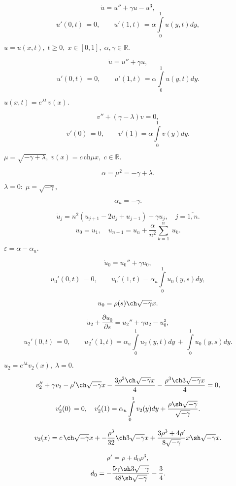 \documentclass[12pt]{extarticle}
\begin{document}
$$	\dot u = u'' + \gamma u - u^3,	$$
$$	u'(0, t) \, = 0, \qquad u'(1, t) \, = \alpha \int\limits_{0}^{1} u(y, t) dy, $$

$ u = u(x, t), \; t \geqslant 0, \; x \in [0, 1], \; \alpha, \gamma \in \mathbb{R}. $

$$	\dot u = u'' + \gamma u, $$
$$	u'(0, t) \, = 0, \qquad u'(1, t) \, = \alpha\int\limits_{0}^{1} u(y, t) dy. $$

$ u(x, t) = e^{\lambda t} \, v(x). $

$$ v'' + (\gamma - \lambda)v = 0, $$	
$$ v'(0) \, = 0, \qquad v'(1)  = \alpha\int\limits_{0}^{1} v(y) dy. $$

$ \mu = \sqrt{-\gamma + \lambda}, \; v(x) = c \, \mbox{ch}  \mu x, \; c \in \mathbb{R}. $

$$	\alpha = \mu^2 = -\gamma + \lambda. $$

$ \lambda = 0: \; \mu = \sqrt{-\gamma}, $ 

$$	\alpha_u = -\gamma. $$

$$ \dot{u}_j =  n^2(u_{j+1} - 2u_j + u_{j-1}) + \gamma u_j, \quad j = \overline{1, n}. $$
$$ u_0 = u_1, \quad u_{n+1} = u_n + \frac{\alpha}{n^2} \sum_{k=1}^{n} \:u_k. $$

$ \varepsilon = \alpha-\alpha_u. $

$$	\dot u_0 = u_0'' + \gamma u_0, $$
$$	u_0'(0, t) \, = 0, \qquad u_0'(1, t) = \alpha_u\int\limits_{0}^{1} u_0(y, s) dy, $$

$$ u_0 = \rho(s) \ch \sqrt{-\gamma} x. $$

$$	\dot u_2 + \frac{\partial u_0}{\partial s} = u_2'' + \gamma u_2 - u_0^3, $$
$$	u_2'(0, t) \, = 0, \qquad u_2'(1, t) = \alpha_u\int\limits_{0}^{1} u_2(y, t) dy \, + \, \int\limits_{0}^{1} u_0(y, s) dy. $$

$ u_2 = e^{\lambda t}v_2(x), \; \lambda = 0. $

$$	v_2'' + \gamma v_2 - \rho' \ch \sqrt{-\gamma} x - \frac{3\rho^3\ch\sqrt{-\gamma}x}{4} - \frac{\rho^3\ch3\sqrt{-\gamma}x}{4} = 0, $$
$$	v_2'(0) \, = 0, \quad v_2'(1) = \alpha_u\int\limits_{0}^{1} v_2(y) dy + \frac{\rho\sh\sqrt{-\gamma}}{\sqrt{-\gamma}}. $$

$$ v_2(x) = c\,\ch \sqrt{-\gamma} x + - \frac{\rho^3}{32}\ch3\sqrt{-\gamma}x + \frac{3\rho^3+4\rho'}{8\sqrt{-\gamma}}x\sh\sqrt{-\gamma}x. $$

$$	\rho' = \rho + d_0 \rho^3, $$
$$ d_0 = -\frac{5\gamma\sh3\sqrt{-\gamma}}{48\sh\sqrt{-\gamma}} - \frac{3}{4}. $$
\end{document}
